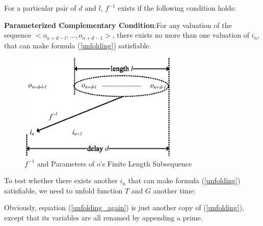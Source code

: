 \documentclass[journal]{IEEEtran}
\begin{document}
For a particular pair of $d$ and $l$,
$f^{-1}$ exists if the following condition holds:

\vspace{0.2cm}

\begin{definition11}\label{UniquenessAssumption}
\textbf{Parameterized Complementary Condition}:For any valuation of the sequence $<o_{n+d-l},\dots , o_{n+d-1} >$,
there exists no more than one valuation of $i_n$,
that can make formula (\ref{unfolding}) satisfiable.
\end{definition11}

\vspace{0.2cm}

\begin{figure}[t]
\centering
\includegraphics[width=3in]{dl}
\caption{$f^{-1}$ and Parameters of $o$'s Finite Length Subsequence }
\label{dl}
\end{figure}
To test whether there exists another $i_n$ that can make formula (\ref{unfolding}) satisfiable,
we need to unfold function $T$ and $G$ another time:
\begin{equation}\label{unfolding_again}
\end{equation}

Obviously,
equation (\ref{unfolding_again}) is just another copy of (\ref{unfolding}),
except that its variables are all renamed by appending a prime.
\end{document}
